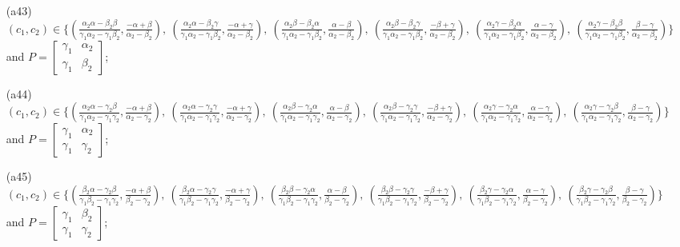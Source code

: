 \begin{enumerate}
\item[(a43)] $(c_1,c_2)\in \{(\frac{\alpha_2 \alpha  - \beta_2 \beta }{\gamma_1 \alpha_2 - \gamma_1 \beta_2},\frac{-\alpha  + \beta }{\alpha_2 - \beta_2}),\allowbreak\ (\frac{\alpha_2 \alpha  - \beta_2 \gamma }{\gamma_1 \alpha_2 - \gamma_1 \beta_2},\frac{-\alpha  + \gamma }{\alpha_2 - \beta_2}),\allowbreak\ (\frac{\alpha_2 \beta  - \beta_2 \alpha }{\gamma_1 \alpha_2 - \gamma_1 \beta_2},\frac{\alpha  - \beta }{\alpha_2 - \beta_2}),\allowbreak\ (\frac{\alpha_2 \beta  - \beta_2 \gamma }{\gamma_1 \alpha_2 - \gamma_1 \beta_2},\frac{-\beta  + \gamma }{\alpha_2 - \beta_2}),\allowbreak\ (\frac{\alpha_2 \gamma  - \beta_2 \alpha }{\gamma_1 \alpha_2 - \gamma_1 \beta_2},\frac{\alpha  - \gamma }{\alpha_2 - \beta_2}),\allowbreak\ (\frac{\alpha_2 \gamma  - \beta_2 \beta }{\gamma_1 \alpha_2 - \gamma_1 \beta_2},\frac{\beta  - \gamma }{\alpha_2 - \beta_2})\}$ and $P=\begin{bmatrix}\gamma_1&\alpha_2\\\gamma_1&\beta_2\end{bmatrix}$;
\item[(a44)] $(c_1,c_2)\in \{(\frac{\alpha_2 \alpha  - \gamma_2 \beta }{\gamma_1 \alpha_2 - \gamma_1 \gamma_2},\frac{-\alpha  + \beta }{\alpha_2 - \gamma_2}),\allowbreak\ (\frac{\alpha_2 \alpha  - \gamma_2 \gamma }{\gamma_1 \alpha_2 - \gamma_1 \gamma_2},\frac{-\alpha  + \gamma }{\alpha_2 - \gamma_2}),\allowbreak\ (\frac{\alpha_2 \beta  - \gamma_2 \alpha }{\gamma_1 \alpha_2 - \gamma_1 \gamma_2},\frac{\alpha  - \beta }{\alpha_2 - \gamma_2}),\allowbreak\ (\frac{\alpha_2 \beta  - \gamma_2 \gamma }{\gamma_1 \alpha_2 - \gamma_1 \gamma_2},\frac{-\beta  + \gamma }{\alpha_2 - \gamma_2}),\allowbreak\ (\frac{\alpha_2 \gamma  - \gamma_2 \alpha }{\gamma_1 \alpha_2 - \gamma_1 \gamma_2},\frac{\alpha  - \gamma }{\alpha_2 - \gamma_2}),\allowbreak\ (\frac{\alpha_2 \gamma  - \gamma_2 \beta }{\gamma_1 \alpha_2 - \gamma_1 \gamma_2},\frac{\beta  - \gamma }{\alpha_2 - \gamma_2})\}$ and $P=\begin{bmatrix}\gamma_1&\alpha_2\\\gamma_1&\gamma_2\end{bmatrix}$;
\item[(a45)] $(c_1,c_2)\in \{(\frac{\beta_2 \alpha  - \gamma_2 \beta }{\gamma_1 \beta_2 - \gamma_1 \gamma_2},\frac{-\alpha  + \beta }{\beta_2 - \gamma_2}),\allowbreak\ (\frac{\beta_2 \alpha  - \gamma_2 \gamma }{\gamma_1 \beta_2 - \gamma_1 \gamma_2},\frac{-\alpha  + \gamma }{\beta_2 - \gamma_2}),\allowbreak\ (\frac{\beta_2 \beta  - \gamma_2 \alpha }{\gamma_1 \beta_2 - \gamma_1 \gamma_2},\frac{\alpha  - \beta }{\beta_2 - \gamma_2}),\allowbreak\ (\frac{\beta_2 \beta  - \gamma_2 \gamma }{\gamma_1 \beta_2 - \gamma_1 \gamma_2},\frac{-\beta  + \gamma }{\beta_2 - \gamma_2}),\allowbreak\ (\frac{\beta_2 \gamma  - \gamma_2 \alpha }{\gamma_1 \beta_2 - \gamma_1 \gamma_2},\frac{\alpha  - \gamma }{\beta_2 - \gamma_2}),\allowbreak\ (\frac{\beta_2 \gamma  - \gamma_2 \beta }{\gamma_1 \beta_2 - \gamma_1 \gamma_2},\frac{\beta  - \gamma }{\beta_2 - \gamma_2})\}$ and $P=\begin{bmatrix}\gamma_1&\beta_2\\\gamma_1&\gamma_2\end{bmatrix}$;
\end{enumerate}
